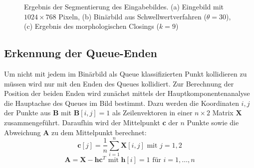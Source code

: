 \begin{figure}[H]
	\label{fig:thresholded}
	\centering
	\caption{Ergebnis der Segmentierung des Eingabebildes. (a) Eingebild mit $1024 \times 768$ Pixeln, (b) Binärbild aus Schwellwertverfahren ($\theta = 30$),  (c) Ergebnis des morphologischen Closings ($k=9$)}
\end{figure}

\subsection{Erkennung der Queue-Enden}
Um nicht mit jedem im Binärbild als Queue klassifizierten Punkt kollidieren zu müssen wird nur mit den Enden des Queues kollidiert.
Zur Berechnung der Position der beiden Enden wird zunächst mittels der Hauptkomponentenanalyse \cite{OpenCV:PCA} die Hauptachse des Queues im Bild bestimmt. 
Dazu werden die Koordinaten $i, j$ der Punkte aus $\textbf{B}$ mit $\textbf{B}[i,j] = 1$ als Zeilenvektoren in einer $n \times 2$ Matrix $\textbf{X}$ zusammengeführt.
Daraufhin wird der Mittelpunkt \textbf{c} der $n$ Punkte sowie die Abweichung $\textbf{A}$ zu dem Mittelpunkt berechnet:
\begin{equation*}
\textbf{c}[j] = \frac{1}{n}\sum_{i=1}^{n}\textbf{X}[i, j]\text{ mit }j = 1, 2
\end{equation*}
\begin{equation*}
\textbf{A} = \textbf{X} - \textbf{h}\textbf{c}^T \text{ mit } \textbf{h}[i] = 1 \text{ für } i=1,\dots,n
\end{equation*}

